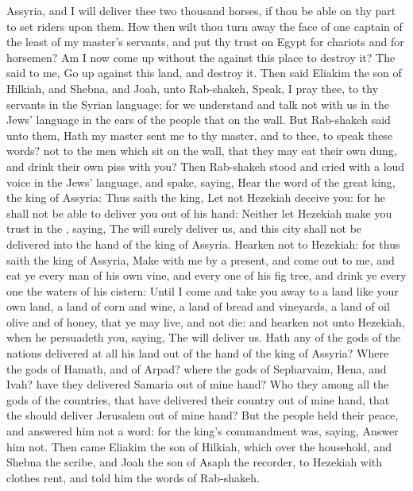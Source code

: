 {Assyria, and I will
deliver thee two
thousand
horses, if thou be
able on thy part to
set
riders upon them.
How then wilt thou turn
away the
face of
one
captain of the
least of my
master’s
servants, and put thy
trust on
Egypt for
chariots and for
horsemen?
Am I now come
up
without the
{} against this
place to
destroy it? The
{}
said to me, Go
up against this
land, and
destroy it.
Then
said
Eliakim the
son of
Hilkiah, and
Shebna, and
Joah, unto
Rab-shakeh,
Speak, I pray thee, to thy
servants in the Syrian
language; for we
understand
{} and
talk not with us in the
Jews’ language in the
ears of the
people that
{} on the
wall.
But
Rab-shakeh
said unto them, Hath my
master
sent me to thy
master, and to thee, to
speak these
words?
{} not
{} to the
men which
sit on the
wall, that they may
eat their own
dung, and
drink their own
piss with you?
Then
Rab-shakeh
stood and
cried with a
loud
voice in the
Jews’ language, and
spake,
saying,
Hear the
word of the
great
king, the
king of
Assyria:
Thus
saith the
king, Let not
Hezekiah
deceive you: for he shall not be
able to
deliver you out of his
hand:
Neither let
Hezekiah make you
trust in the
{},
saying, The
{} will
surely
deliver us, and this
city shall not be
delivered into the
hand of the
king of
Assyria.
Hearken not to
Hezekiah: for thus
saith the
king of
Assyria,
Make
{} with me by a
present, and come
out to me, and
{}
eat ye every
man of his own
vine, and every
one of his fig
tree, and
drink ye every
one the
waters of his
cistern:
Until I
come and take you
away to a
land like your own
land, a
land of
corn and
wine, a
land of
bread and
vineyards, a
land of
oil
olive and of
honey, that ye may
live, and not
die: and
hearken not unto
Hezekiah, when he
persuadeth you,
saying, The
{} will
deliver us.
Hath
any of the
gods of the
nations
delivered at
all his
land out of the
hand of the
king of
Assyria?
Where
{} the
gods of
Hamath, and of
Arpad? where
{} the
gods of
Sepharvaim,
Hena, and
Ivah? have they
delivered
Samaria out of mine
hand?
Who
{} they among all the
gods of the
countries, that have
delivered their
country out of mine
hand, that the
{} should
deliver
Jerusalem out of mine
hand?
But the
people held their
peace, and
answered him not a
word: for the
king’s
commandment was,
saying,
Answer him not.
Then
came
Eliakim the
son of
Hilkiah, which
{} over the
household, and
Shebna the
scribe, and
Joah the
son of
Asaph the
recorder, to
Hezekiah with
{}
clothes
rent, and
told him the
words of
Rab-shakeh.

}

